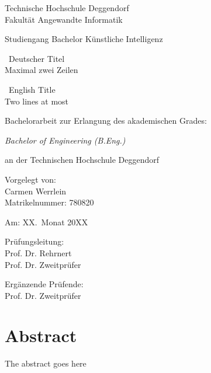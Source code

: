 \documentclass[12pt]{article}
\newcommand{\student}{Carmen Werrlein}
\newcommand{\matrnr}{780820}
\newcommand{\submissiondate}{XX.\ Monat 20XX}
\newcommand{\supervisor}{Prof. Dr. Rehrnert}
\newcommand{\secsupervisor}{Prof. Dr. Zweitprüfer} %
\newcommand{\faculty}{Angewandte Informatik}
\newcommand{\studies}{Bachelor Künstliche Intelligenz}
\newcommand{\degree}{Bachelor of Engineering (B.Eng.)}
\begin{document}
\pagestyle{headings}

\begin{titlepage}
\begin{center}
	{\usekomafont
	Technische Hochschule Deggendorf\\
	Fakultät \faculty\par}
	\vspace{.2cm}
{\Large Studiengang \studies\\}
\vspace{6\baselineskip}
{\Huge\usekomafont\ Deutscher Titel\\Maximal zwei Zeilen\par}
\vspace{1cm}
{\Huge\usekomafont\ English Title\\Two lines at most\par}
\vspace{6\baselineskip}

\usekomafont
Bachelorarbeit zur Erlangung des akademischen Grades:

	\vspace{.2cm}
	\emph{\degree}
	\vspace{.2cm}

an der Technischen Hochschule Deggendorf\\
\end{center}
\vfill
\parbox[t]{.4\textwidth}{\usekomafont
	Vorgelegt von:\\
	\student\\
	Matrikelnummer: \matrnr\par
	\vspace{\baselineskip}
	Am: \submissiondate\par
}
\hfill
\parbox[t]{.4\textwidth}{\usekomafont
Prüfungsleitung:\\
\supervisor \\
\secsupervisor

\vspace{\baselineskip}
Ergänzende Prüfende:\\
\secsupervisor%
}
\end{titlepage}
\cleardoublepage\par


\chapter*{Abstract}
The abstract goes here

\tableofcontents
\end{document}
